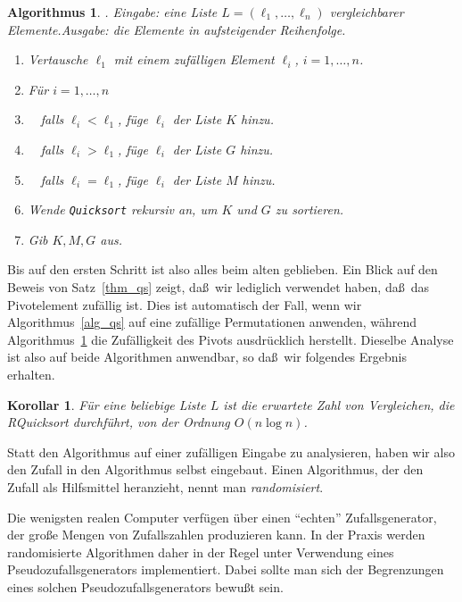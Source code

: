 \documentclass[10pt,reqno]{amsart}
\numberwithin{equation}{section}
\newtheorem{corollary}[definition]{Korollar}
\newtheorem{algorithm}[definition]{Algorithmus}
\newcommand\Thm{Satz}
\begin{document}
\begin{algorithm}. {\em Eingabe:} eine Liste $L=(\ell_1,\ldots,\ell_n)$ vergleichbarer Elemente.\label{alg_rqs}
	{\em Ausgabe:} die Elemente in aufsteigender Reihenfolge.
	\begin{enumerate}
		\item Vertausche $\ell_1$ mit einem zuf\"alligen Element $\ell_i$, $i=1,\ldots,n$.
		\item F\"ur $i=1,\ldots,n$
		\item $\quad$falls $\ell_i<\ell_1$, f\"uge $\ell_i$ der Liste $K$ hinzu.
		\item $\quad$falls $\ell_i>\ell_1$, f\"uge $\ell_i$ der Liste $G$ hinzu.
		\item $\quad$falls $\ell_i=\ell_1$, f\"uge $\ell_i$ der Liste $M$ hinzu.
		\item Wende {\tt Quicksort} rekursiv an, um $K$ und $G$ zu sortieren.
		\item Gib $K,M,G$ aus.
	\end{enumerate}
\end{algorithm}

Bis auf den ersten Schritt ist also alles beim alten geblieben.
Ein Blick auf den Beweis von \Thm~\ref{thm_qs} zeigt, da\ss\ wir lediglich verwendet haben, da\ss\ das Pivotelement zuf\"allig ist.
Dies ist automatisch der Fall, wenn wir Algorithmus~\ref{alg_qs} auf eine zuf\"allige Permutationen anwenden, w\"ahrend Algorithmus~\ref{alg_rqs} die Zuf\"alligkeit des Pivots ausdr\"ucklich herstellt.
Dieselbe Analyse ist also auf beide Algorithmen anwendbar, so da\ss\ wir folgendes Ergebnis erhalten.

\begin{corollary}\label{cor_qs}
	F\"ur eine beliebige Liste $L$ ist die erwartete Zahl von Vergleichen, die RQuicksort durchf\"uhrt, von der Ordnung $O(n\log n)$.
\end{corollary}

Statt den Algorithmus auf einer zuf\"alligen Eingabe zu analysieren, haben wir also den Zufall in den Algorithmus selbst eingebaut.
Einen Algorithmus, der den Zufall als Hilfsmittel heranzieht, nennt man {\em randomisiert}.

Die wenigsten realen Computer verf\"ugen \"uber einen ``echten'' Zufallsgenerator, der gro\ss e Mengen von Zufallszahlen produzieren kann.
In der Praxis werden randomisierte Algorithmen daher in der Regel unter Verwendung eines Pseudozufallsgenerators implementiert.
Dabei sollte man sich der Begrenzungen eines solchen Pseudozufallsgenerators bewu\ss t sein.
\end{document}

